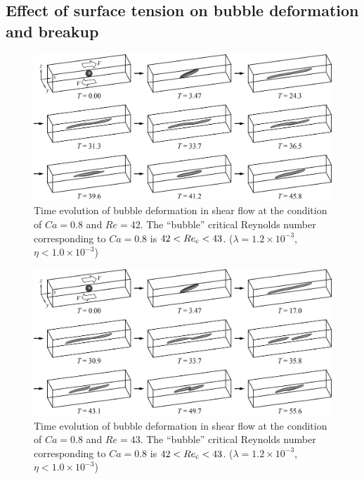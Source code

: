 \documentclass[%
 reprint,
 showkeys,
 amsmath,amssymb,
 aps,
 prfluids,
 onecolumn
]{revtex4-2}
\begin{document}
\subsection{Effect of surface tension on bubble deformation and breakup}
%
\begin{figure}%
  \centering
  \includegraphics[width=\textwidth]{BubbleDeformCa0p8Re42}
  \caption{Time evolution of bubble deformation in shear flow at the 
           condition of $Ca=0.8$ and $Re=42$.
	   The ``bubble'' 
	   critical Reynolds number corresponding to $Ca=0.8$ is
	   $42<Re_{\rm c}<43$.
           ($\lambda = 1.2 \times 10^{-3}$, $\eta < 1.0 \times 10^{-3}$) 
	   }
  \label{fig:BubDefCa0p8Re42}
\end{figure}
%
\begin{figure}%
  \centering
  \includegraphics[width=\textwidth]{BubbleBreakCa0p8Re43}
  \caption{Time evolution of bubble deformation in shear flow at the 
           condition of $Ca=0.8$ and $Re=43$.
	   The ``bubble'' 
	   critical Reynolds number corresponding to $Ca=0.8$ is
	   $42<Re_{\rm c}<43$.
           ($\lambda = 1.2 \times 10^{-3}$, $\eta < 1.0 \times 10^{-3}$) 
	   }
  \label{fig:BubBrkCa0p8Re43}
\end{figure}
\end{document}
